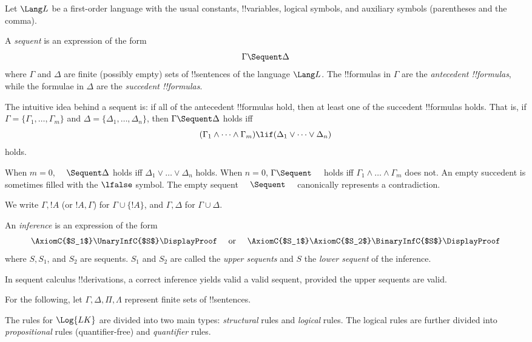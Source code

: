 \documentclass[../../../include/open-logic-section]{subfiles}
\begin{document}


Let $\Lang L$ be a first-order language with the usual constants,
!!{variable}s, logical symbols, and auxiliary symbols (parentheses
and the comma).

\begin{defn}[sequent]
A \emph{sequent} is an expression of the form
\[ \Gamma \Sequent \Delta \]
where $\Gamma$ and $\Delta$ are finite (possibly empty) sets of
!!{sentence}s of the language $\Lang L$. The !!{formula}s in $\Gamma$
are the \emph{antecedent !!{formula}s}, while the formulae in $\Delta$ are
the \emph{succedent !!{formula}s}.

The intuitive idea behind a sequent is: if all of the antecedent
!!{formula}s hold, then at least one of the succedent !!{formula}s
holds. That is, if $\Gamma = \{ \Gamma_1, \dots, \Gamma_m\}$ and
$\Delta = \{ \Delta_1, \dots, \Delta_n\}$, then $\Gamma \Sequent
\Delta$ holds iff
\[
(\Gamma_1 \land \cdots \land \Gamma_m) \lif (\Delta_1 \lor \cdots \lor
\Delta_n) \] holds.

When $m=0$, $\quad \Sequent \Delta$ holds iff $\Delta_1 \lor \dots
\lor \Delta_n$ holds. When $n=0$, $\Gamma \Sequent \quad$ holds iff
$\Gamma_1 \land \dots \land \Gamma_m$ does not. An empty succedent is
sometimes filled with the $\lfalse$ symbol. The empty sequent
$\quad \Sequent \quad$ canonically represents a
contradiction.
\end{defn}

We write $\Gamma, !A$ (or $!A, \Gamma$) for $\Gamma \cup \{!A\}$, and
$\Gamma, \Delta$ for $\Gamma \cup \Delta$.

\begin{defn}[Inference]
An \emph{inference} is an expression of the form
\[
\AxiomC{$S_1$}
\UnaryInfC{$S$}
\DisplayProof
\quad
\textrm{  or  }
\quad
\AxiomC{$S_1$}
\AxiomC{$S_2$}
\BinaryInfC{$S$}
\DisplayProof
\]
where $S, S_1$, and $S_2$ are sequents. $S_1$ and $S_2$ are called the
\emph{upper sequents} and $S$ the \emph{lower sequent} of the
inference.
\end{defn}

In sequent calculus !!{derivation}s, a correct inference yields valid
a valid sequent, provided the upper sequents are valid.

For the following, let $\Gamma, \Delta, \Pi, \Lambda$ represent finite
sets of !!{sentence}s.

The rules for $\Log{LK}$ are divided into two main types:
\emph{structural} rules and \emph{logical} rules. The logical rules
are further divided into \emph{propositional} rules (quantifier-free)
and \emph{quantifier} rules.
\end{document}
